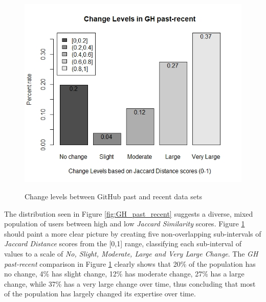         \begin{figure}
          \centering
          \includegraphics[width=\textwidth]{figures/change_level_GH_past-recent.jpeg}\\
          \caption{Change levels between GitHub past and recent data sets}
          \label{fig:change_GH_past_recent}
        \end{figure}
        
        The distribution seen in Figure \ref{fig:GH_past_recent} suggests a diverse, mixed population of users between high and low \emph{Jaccard Similarity} scores. Figure \ref{fig:change_GH_past_recent} should paint a more clear picture by creating five non-overlapping sub-intervals of \emph{Jaccard Distance} scores from the [0,1] range, classifying each sub-interval of values to a scale of \emph{No, Slight, Moderate, Large and Very Large Change}. The \emph{GH past-recent} comparison in Figure \ref{fig:change_GH_past_recent} clearly shows that 20\% of the population has no change, 4\% has slight change, 12\% has moderate change, 27\% has a large change, while 37\% has a very large change over time, thus concluding that most of the population has largely changed its expertise over time.
        
